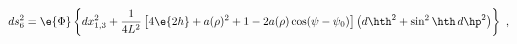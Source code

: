 \begin{equation}
\label{metric6}
  ds_6^2 = \e{\Phi} \left\{ dx_{1,3}^2 + \frac1{4L^2}
  \left[ 4\e{2h} +a(\rho)^2 +1 -2a(\rho)\cos(\psi-\psi_0)\right] 
  \left( d\hth^2 +\sin^2\hth \, d\hp^2 \right) \right\}~,
\end{equation}

